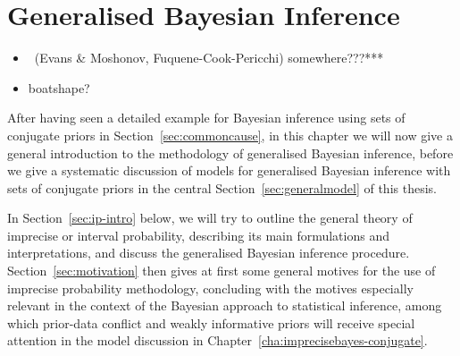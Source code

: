 \chapter{Generalised Bayesian Inference}
\label{cha:gbi}

\begin{itemize}
\item \pdc\ (Evans \& Moshonov, Fuquene-Cook-Pericchi) somewhere???*** %
\item boatshape?
\end{itemize}



After having seen a detailed example for Bayesian inference using sets of conjugate priors in Section~\ref{sec:commoncause},
in this chapter we will now give a general introduction to the methodology of generalised Bayesian inference,
before we give a systematic discussion of models for generalised Bayesian inference with sets of conjugate priors
in the central Section~\ref{sec:generalmodel} of this thesis.

In Section~\ref{sec:ip-intro} below, we will try to outline the general theory of imprecise or interval probability,
describing its main formulations and interpretations, and discuss the generalised Bayesian inference procedure.
Section~\ref{sec:motivation} then gives at first some general motives for the use of imprecise probability methodology,
concluding with the motives especially relevant in the context of the Bayesian approach to statistical inference,
among which prior-data conflict and weakly informative priors will receive special attention
in the model discussion in Chapter~\ref{cha:imprecisebayes-conjugate}.


